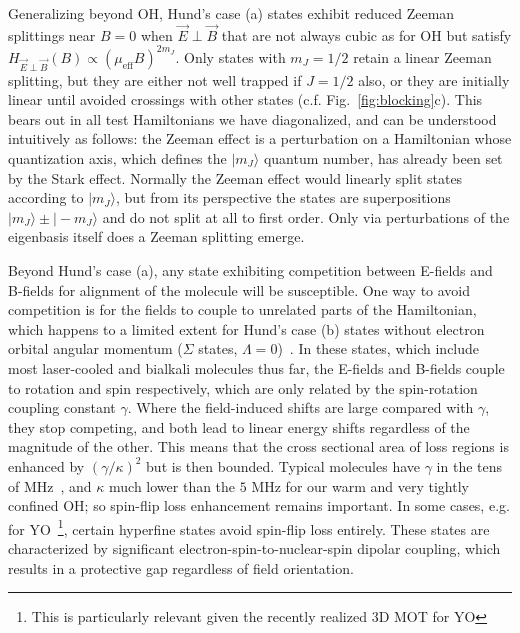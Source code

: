 \documentclass[%
 reprint,
 amsmath,amssymb,
 aps,
prl,
]{revtex4-1}
\newcommand{\epb}{{$\vec{E}\!\perp\!\vec{B}$}}
\newcommand{\epbm}{{\vec{E}\!\perp\!\vec{B}}}
\begin{document}
Generalizing beyond OH, Hund's case (a) states exhibit reduced Zeeman splittings near $B\!=\!0$ when \epb{} that are not always cubic as for OH but satisfy $H_\epbm(B)\propto (\mu_\text{eff}B)^{2m_J}$. 
Only states with $m_J=1/2$ retain a linear Zeeman splitting, but they are either not well trapped if $J=1/2$ also, or they are initially linear until avoided crossings with other states (c.f. Fig.~\ref{fig:blocking}c). 
This bears out in all test Hamiltonians we have diagonalized, and can be understood intuitively as follows: the Zeeman effect is a perturbation on a Hamiltonian whose quantization axis, which defines the $|m_J\rangle$ quantum number, has already been set by the Stark effect. 
Normally the Zeeman effect would linearly split states according to $|m_J\rangle$, but from its perspective the states are superpositions $|m_J\rangle\pm|\!-\!m_J\rangle$ and do not split at all to first order. 
Only via perturbations of the eigenbasis itself does a Zeeman splitting emerge.

Beyond Hund's case (a), any state exhibiting competition between E-fields and B-fields for alignment of the molecule will be susceptible. 
One way to avoid competition is for the fields to couple to unrelated parts of the Hamiltonian, which happens to a limited extent for Hund's case (b) states without electron orbital angular momentum ($\Sigma$ states, $\Lambda=0$)~\cite{Bohn2013}. 
In these states, which include most laser-cooled and bialkali molecules thus far, the E-fields and B-fields couple to rotation and spin respectively, which are only related by the spin-rotation coupling constant $\gamma$. 
Where the field-induced shifts are large compared with $\gamma$, they stop competing, and both lead to linear energy shifts regardless of the magnitude of the other. 
This means that the cross sectional area of loss regions is enhanced by $(\gamma/\kappa)^2$ but is then bounded. 
Typical molecules have $\gamma$ in the tens of MHz~\cite{Quemener2016}, and $\kappa$ much lower than the $5\text{ MHz}$ for our warm and very tightly confined OH; so spin-flip loss enhancement remains important. 
In some cases, e.g. for YO~\footnote{This is particularly relevant given the recently realized 3D MOT for YO}, certain hyperfine states avoid spin-flip loss entirely. 
These states are characterized by significant electron-spin-to-nuclear-spin dipolar coupling, which results in a protective gap regardless of field orientation.


\end{document}
